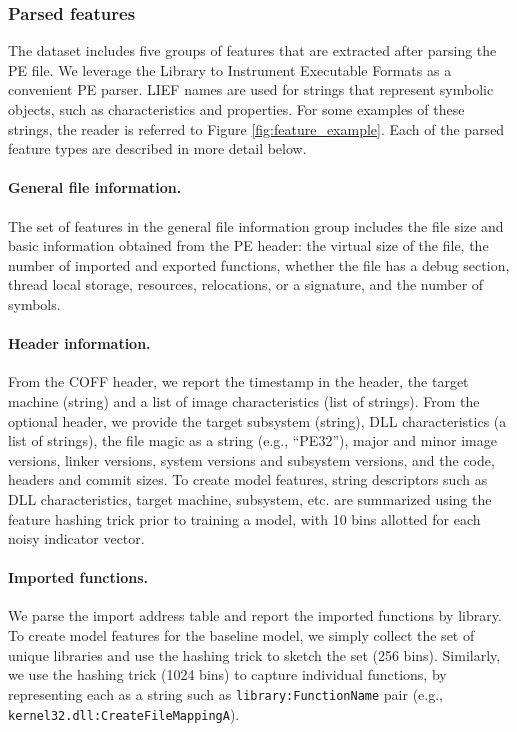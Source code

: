\subsubsection{Parsed features}
The dataset includes five groups of features that are extracted after parsing the PE file.  We leverage the Library to Instrument Executable Formats \cite{LIEF} as a convenient PE parser.  LIEF names are used for strings that represent symbolic objects, such as characteristics and properties.  For some examples of these strings, the reader is referred to Figure \ref{fig:feature_example}.  Each of the parsed feature types are described in more detail below.

\paragraph{General file information.} The set of features in the general file information group includes the file size and basic information obtained from the PE header: the virtual size of the file, the number of imported and exported functions, whether the file has a debug section, thread local storage, resources, relocations, or a signature, and the number of symbols.

\paragraph{Header information.}  From the COFF header, we report the timestamp in the header, the target machine (string) and a list of image characteristics (list of strings).  From the optional header, we provide the target subsystem (string), DLL characteristics (a list of strings), the file magic as a string (e.g., ``PE32''), major and minor image versions, linker versions, system versions and subsystem versions, and the code, headers and commit sizes.  To create model features, string descriptors such as DLL characteristics, target machine, subsystem, etc. are summarized using the feature hashing trick prior to training a model, with 10 bins allotted for each noisy indicator vector.

\paragraph{Imported functions.}  We parse the import address table and report the imported functions by library.  To create model features for the baseline model, we simply collect the set of unique libraries and use the hashing trick to sketch the set (256 bins).  Similarly, we use the hashing trick (1024 bins) to capture individual functions, by representing each as a string such as \texttt{library:FunctionName} pair (e.g., \texttt{kernel32.dll:CreateFileMappingA}).

